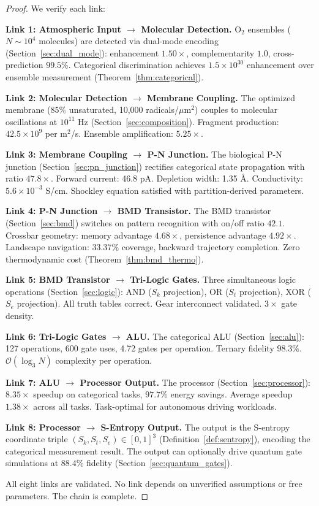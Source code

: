 \documentclass[12pt]{article}
\theoremstyle{definition}
\theoremstyle{remark}
\newcommand{\Sk}{S_k}
\newcommand{\St}{S_t}
\newcommand{\Se}{S_e}
\begin{document}
\begin{proof}
We verify each link:

\medskip
\noindent\textbf{Link 1: Atmospheric Input $\to$ Molecular Detection.}
O$_2$ ensembles ($N \sim 10^4$ molecules) are detected via dual-mode encoding (Section~\ref{sec:dual_mode}): enhancement $1.50\times$, complementarity $1.0$, cross-prediction $99.5\%$. Categorical discrimination achieves $1.5 \times 10^{30}$ enhancement over ensemble measurement (Theorem~\ref{thm:categorical}). \checkmark

\medskip
\noindent\textbf{Link 2: Molecular Detection $\to$ Membrane Coupling.}
The optimized membrane ($85\%$ unsaturated, 10,000 radicals/$\mu$m$^2$) couples to molecular oscillations at $10^{11}$ Hz (Section~\ref{sec:composition}). Fragment production: $42.5 \times 10^9$ per m$^2$/s. Ensemble amplification: $5.25\times$. \checkmark

\medskip
\noindent\textbf{Link 3: Membrane Coupling $\to$ P-N Junction.}
The biological P-N junction (Section~\ref{sec:pn_junction}) rectifies categorical state propagation with ratio $47.8\times$. Forward current: 46.8 pA. Depletion width: 1.35 \AA. Conductivity: $5.6 \times 10^{-3}$ S/cm. Shockley equation satisfied with partition-derived parameters. \checkmark

\medskip
\noindent\textbf{Link 4: P-N Junction $\to$ BMD Transistor.}
The BMD transistor (Section~\ref{sec:bmd}) switches on pattern recognition with on/off ratio $42.1$. Crossbar geometry: memory advantage $4.68\times$, persistence advantage $4.92\times$. Landscape navigation: $33.37\%$ coverage, backward trajectory completion. Zero thermodynamic cost (Theorem~\ref{thm:bmd_thermo}). \checkmark

\medskip
\noindent\textbf{Link 5: BMD Transistor $\to$ Tri-Logic Gates.}
Three simultaneous logic operations (Section~\ref{sec:logic}): AND ($\Sk$ projection), OR ($\St$ projection), XOR ($\Se$ projection). All truth tables correct. Gear interconnect validated. $3\times$ gate density. \checkmark

\medskip
\noindent\textbf{Link 6: Tri-Logic Gates $\to$ ALU.}
The categorical ALU (Section~\ref{sec:alu}): 127 operations, 600 gate uses, 4.72 gates per operation. Ternary fidelity $98.3\%$. $\mathcal{O}(\log_3 N)$ complexity per operation. \checkmark

\medskip
\noindent\textbf{Link 7: ALU $\to$ Processor Output.}
The processor (Section~\ref{sec:processor}): $8.35\times$ speedup on categorical tasks, $97.7\%$ energy savings. Average speedup $1.38\times$ across all tasks. Task-optimal for autonomous driving workloads. \checkmark

\medskip
\noindent\textbf{Link 8: Processor $\to$ S-Entropy Output.}
The output is the S-entropy coordinate triple $(\Sk, \St, \Se) \in [0,1]^3$ (Definition~\ref{def:sentropy}), encoding the categorical measurement result. The output can optionally drive quantum gate simulations at $88.4\%$ fidelity (Section~\ref{sec:quantum_gates}). \checkmark

\medskip
All eight links are validated. No link depends on unverified assumptions or free parameters. The chain is complete. \qedhere
\end{proof}
\end{document}
